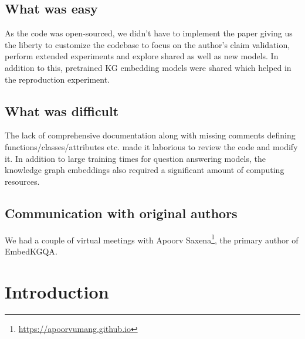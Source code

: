 \subsection{What was easy}
As the code was open-sourced, we didn't have to implement the paper giving us the liberty to customize the codebase to focus on the author's claim validation, perform extended experiments and explore shared as well as new models. In addition to this, pretrained KG embedding models were shared which helped in the reproduction experiment. 

\subsection{What was difficult}

The lack of comprehensive documentation along with missing comments defining functions/classes/attributes etc. made it laborious to review the code and modify it. In addition to large training times for question answering models, the knowledge graph embeddings also required a significant amount of computing resources.

\subsection{Communication with original authors}
We had a couple of virtual meetings with Apoorv Saxena\footnote{\url{https://apoorvumang.github.io}}, the primary author of EmbedKGQA\cite{saxena-etal-2020-improving}. 


\section{Introduction}

